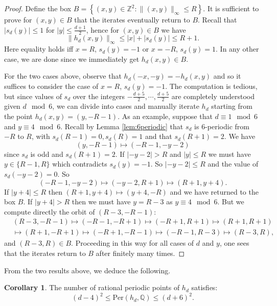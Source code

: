 \documentclass[12pt]{amsart}
\theoremstyle{definition}
\newtheorem{corollary}[theorem]{Corollary}
\begin{document}
\begin{proof}
    Define the box $B = \left\{ (x,y)\in \mathbb{Z}^2:\|(x,y)\|_{\infty}\leq R \right\}$. It is sufficient to prove for $(x,y)\in B$ that the iterates eventually return to $B$. Recall that $|s_d(y)|\leq 1$ for $|y|\leq \frac{d+1}{2}$, hence for $(x,y)\in B$ we have
    $$ \|h_d(x,y)\|_{\infty} \leq |x| + |s_d(y)|\leq R+1.$$
    Here equality holds iff $x = R$, $s_d(y) = -1$ or $x = -R$, $s_d(y) = 1$. In any other case, we are done since we immediately get $h_d(x,y)\in B$.
    
    For the two cases above, observe that $h_d(-x,-y) = -h_d(x,y)$ and so it suffices to consider the case of $x=R$, $s_d(y) = -1$. The computation is tedious, but since values of $s_d$ over the integers $-\frac{d+5}{2},\cdots,\frac{d+5}{2}$ are completely understood given $d\mod 6$, we can divide into cases and manually iterate $h_d$ starting from the point $h_d(x,y) = (y,-R-1)$.  As an example, suppose that $d \equiv 1 \mod 6$ and $y \equiv 4 \mod 6$.  Recall by Lemma \ref{lem:6periodic} that $s_d$ is $6$-periodic from $-R$ to $R$, with $s_d(R-1) = 0, s_d(R) = 1$ and that $s_d(R+1) = 2.$ We have
    $$(y, -R-1) \mapsto (-R-1,-y-2)$$
    since $s_d$ is odd and $s_d(R+1) = 2.$  If $|-y-2| > R$ and $|y| \leq R$ we must have $y \in \{ R-1, R \}$ which contradicts $s_d(y) = -1.$ So $|-y-2| \leq R$ and the value of $s_d(-y-2) = 0.$ So 
        $$(-R-1,-y-2) \mapsto (-y-2, R+1) \mapsto (R+1, y+4).$$
    If $|y+4| \leq R$ then $(R+1, y+4) \mapsto (y+4, -R)$ and we have returned to the box $B$.  If $|y+4| > R$ then we must have $y = R-3$ as $y \equiv 4 \mod 6.$  But we compute directly the orbit of $(R-3, -R-1)$:
        \begin{align*}
        & (R-3,-R-1) \mapsto (-R-1,-R+1) \mapsto (-R+1,R+1) \mapsto (R+1,R+1) \\
        & \mapsto (R+1,-R+1) \mapsto (-R+1,-R-1) \mapsto (-R-1,R-3) \mapsto (R-3,R),
    \end{align*}
    and $(R-3,R) \in B.$ Proceeding in this way for all cases of $d$ and $y$, one sees that the iterates return to $B$ after finitely many times.
\end{proof}
From the two results above, we deduce the following.
\begin{corollary}
    The number of rational periodic points of $h_d$ satisfies:
    $$ (d-4)^2 \leq \text{Per}(h_d,\mathbb{Q}) \leq (d+6)^2. $$
\end{corollary}
\end{document}
